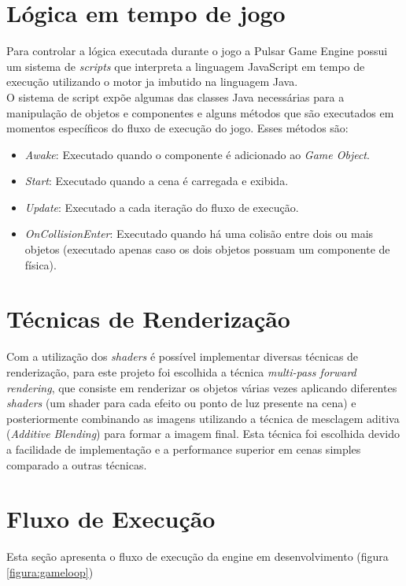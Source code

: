 \documentclass[12pt,	openright, twoside,	a4paper, english, french, spanish, brazil]{abntex2}
\begin{document}
\section{Lógica em tempo de jogo}

Para controlar a lógica executada durante o jogo a Pulsar Game Engine possui um sistema de \textit{scripts} que interpreta a linguagem JavaScript em tempo de execução utilizando o motor ja imbutido na linguagem Java. \\
O sistema de script expõe algumas das classes Java necessárias para a manipulação de objetos e componentes e alguns métodos que são executados em momentos específicos do fluxo de execução do jogo. Esses métodos são:

\begin{itemize}
\item \textit{Awake}: Executado quando o componente é adicionado ao \textit{Game Object}.
\item \textit{Start}: Executado quando a cena é carregada e exibida.
\item \textit{Update}: Executado a cada iteração do fluxo de execução.
\item \textit{OnCollisionEnter}: Executado quando há uma colisão entre dois ou mais objetos (executado apenas caso os dois objetos possuam um componente de física).
\end{itemize}

%
%

\section{Técnicas de Renderização}

Com a utilização dos \textit{shaders} é possível implementar diversas técnicas de renderização, para este projeto foi escolhida a técnica \textit{multi-pass forward rendering}, que consiste em renderizar os objetos várias vezes aplicando diferentes \textit{shaders} (um shader para cada efeito ou ponto de luz presente na cena) e posteriormente combinando as imagens utilizando a técnica de mesclagem aditiva (\textit{Additive Blending}) para formar a imagem final. Esta técnica foi escolhida devido a facilidade de implementação e a performance superior em cenas simples comparado a outras técnicas.

%
%

\section{Fluxo de Execução}
Esta seção apresenta o fluxo de execução da engine em desenvolvimento (figura \ref{figura:gameloop})
\end{document}
